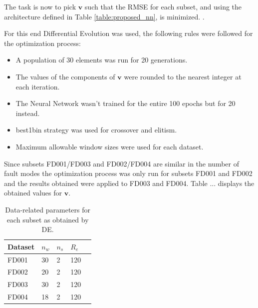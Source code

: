\documentclass{beamer}
\begin{document}
\begin{darkframes}
     \begin{frame}
     
     The task is now to pick $\mathbf{v}$ such that the RMSE for each subset, and using the architecture defined in Table \ref{table:proposed_nn}, is minimized. \vspace{1em}.
     
     For this end Differential Evolution was used, the following rules were followed for the optimization process:
     
     \begin{itemize}
     \item A population of 30 elements was run for 20 generations.
     \item The values of the components of $\mathbf{v}$ were rounded to the nearest integer at each iteration.
     \item The Neural Network wasn't trained for the entire 100 epochs but for 20 instead.
     \item best1bin strategy was used for crossover and elitism.
     \item Maximum allowable window sizes were used for each dataset.
     \end{itemize}
     
     \end{frame}
     
          \begin{frame}
     
     Since subsets FD001/FD003 and FD002/FD004 are similar in the number of fault modes the optimization process was only run for subsets FD001 and FD002 and the results obtained were applied to FD003 and FD004. Table ... displays the obtained values for $\mathbf{v}$. \vspace{1em}
     
     \begin{table}[!htb]
\centering
\begin{tabular}{l l l l l}
	\hline
	 Dataset & $n_w$ &$n_s$ & $R_e$\\
  	\hline
  	FD001 & 30 & 2 & 120\\
  	FD002 & 20 & 2 & 120\\
  	FD003 & 30 & 2 & 120\\
  	FD004 & 18 & 2 & 120\\
  	\hline
\end{tabular}
\caption{Data-related parameters for each subset as obtained by DE.}
\label{table:data_params_de}
\end{table}
     

\end{frame}
\end{darkframes}
\end{document}
